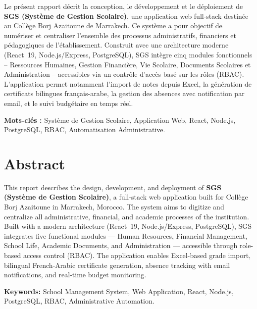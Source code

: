 \documentclass[12pt,a4paper]{report}
\begin{document}
Le présent rapport décrit la conception, le développement et le déploiement de \textbf{SGS (Système de Gestion Scolaire)}, une application web full-stack destinée au Collège Borj Azaitoune de Marrakech. Ce système a pour objectif de numériser et centraliser l'ensemble des processus administratifs, financiers et pédagogiques de l'établissement. Construit avec une architecture moderne (React~19, Node.js/Express, PostgreSQL), SGS intègre cinq modules fonctionnels -- Ressources Humaines, Gestion Financière, Vie Scolaire, Documents Scolaires et Administration -- accessibles via un contrôle d'accès basé sur les rôles (RBAC). L'application permet notamment l'import de notes depuis Excel, la génération de certificats bilingues français-arabe, la gestion des absences avec notification par email, et le suivi budgétaire en temps réel.

\vspace{0.3cm}
\noindent\textbf{Mots-clés :} Système de Gestion Scolaire, Application Web, React, Node.js, PostgreSQL, RBAC, Automatisation Administrative.

\chapter*{Abstract}

This report describes the design, development, and deployment of \textbf{SGS (Système de Gestion Scolaire)}, a full-stack web application built for Collège Borj Azaitoune in Marrakech, Morocco. The system aims to digitize and centralize all administrative, financial, and academic processes of the institution. Built with a modern architecture (React~19, Node.js/Express, PostgreSQL), SGS integrates five functional modules --- Human Resources, Financial Management, School Life, Academic Documents, and Administration --- accessible through role-based access control (RBAC). The application enables Excel-based grade import, bilingual French-Arabic certificate generation, absence tracking with email notifications, and real-time budget monitoring.

\vspace{0.3cm}
\noindent\textbf{Keywords:} School Management System, Web Application, React, Node.js, PostgreSQL, RBAC, Administrative Automation.

\tableofcontents
\newpage
\end{document}

